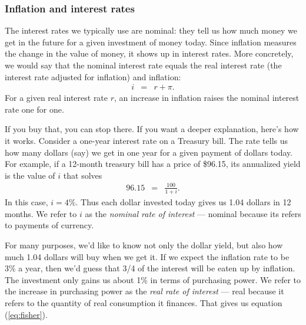 \documentclass[letterpaper,12pt]{article}
\begin{document}
\subsubsection*{Inflation and interest rates}

The interest rates we typically use are nominal:
they tell us how much money we get in the future
for a given investment of money today.
Since inflation measures the change in the value
of money, it shows up in interest rates.
More concretely, we would say that the nominal interest
rate equals the real interest rate (the interest rate
adjusted for inflation) and inflation:
\begin{eqnarray}
    i &=& r + \pi .
    \label{eq:fisher}
\end{eqnarray}
For a given real interest rate $r$,
an increase in inflation raises the nominal interest rate
one for one.

If you buy that, you can stop there.
If you want a deeper explanation,  here's how it works.
Consider a one-year interest rate on a Treasury bill.
The rate tells us how many dollars (say)
we get in one year for a given payment of dollars today.
For example, if a 12-month treasury bill has a price
of \$96.15, its annualized yield is the value of $i$ that solves
%
\begin{eqnarray}
    96.15 &=& \frac{100}{1+i}.
    \label{eq:nominal_yield}
\end{eqnarray}
%
In this case, $i = 4\%$.  Thus each dollar invested today gives us
1.04 dollars in 12 months.
We refer to $i$ as the  {\it nominal rate of interest\/} ---
nominal because its refers to payments of currency.

For many purposes, we'd like to know not only the dollar yield, but
also how much 1.04 dollars will buy when we get it.  If we expect
the inflation rate to be 3\% a year, then we'd guess that 3/4 of the
interest will be eaten up by inflation.  The investment only gains
us about 1\% in terms of purchasing power.
We refer to the increase in purchasing power as the
{\it real rate of interest\/} --- real because it refers to the
quantity of real consumption it finances.
That gives us equation (\ref{eq:fisher}).
\end{document}
